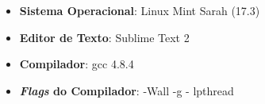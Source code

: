 \begin{itemize}
	\item{\textbf{Sistema Operacional}: Linux Mint Sarah (17.3)}
	\item{\textbf{Editor de Texto}: Sublime Text 2}
	\item{\textbf{Compilador}: gcc 4.8.4}
	\item{\textbf{\emph{Flags} do Compilador}: -Wall -g - lpthread}
\end{itemize}
